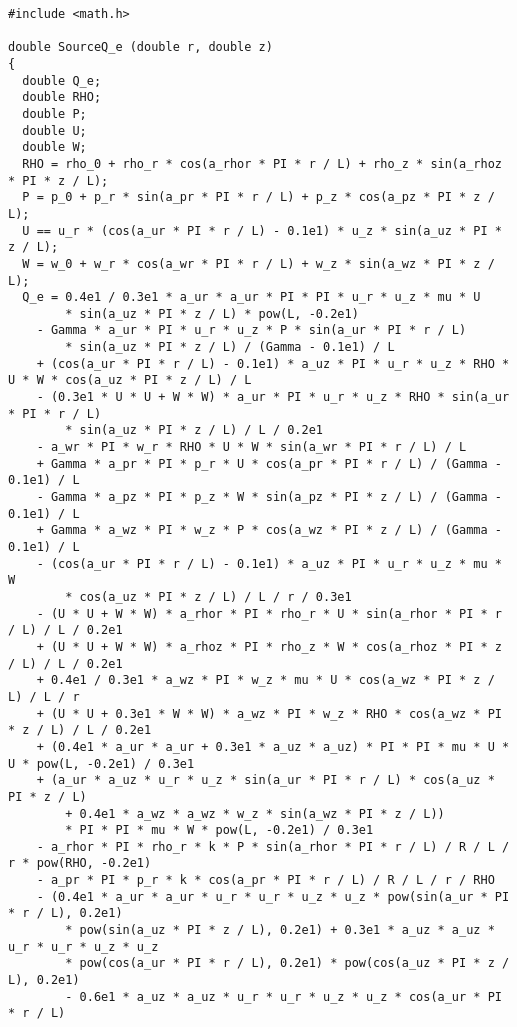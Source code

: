 \documentclass[10pt]{article}
\begin{document}
\begin{small}
\begin{verbatim}
#include <math.h>

double SourceQ_e (double r, double z)
{
  double Q_e;
  double RHO;
  double P;
  double U;
  double W;
  RHO = rho_0 + rho_r * cos(a_rhor * PI * r / L) + rho_z * sin(a_rhoz * PI * z / L);
  P = p_0 + p_r * sin(a_pr * PI * r / L) + p_z * cos(a_pz * PI * z / L);
  U == u_r * (cos(a_ur * PI * r / L) - 0.1e1) * u_z * sin(a_uz * PI * z / L);
  W = w_0 + w_r * cos(a_wr * PI * r / L) + w_z * sin(a_wz * PI * z / L);
  Q_e = 0.4e1 / 0.3e1 * a_ur * a_ur * PI * PI * u_r * u_z * mu * U
        * sin(a_uz * PI * z / L) * pow(L, -0.2e1)
    - Gamma * a_ur * PI * u_r * u_z * P * sin(a_ur * PI * r / L)
        * sin(a_uz * PI * z / L) / (Gamma - 0.1e1) / L
    + (cos(a_ur * PI * r / L) - 0.1e1) * a_uz * PI * u_r * u_z * RHO * U * W * cos(a_uz * PI * z / L) / L
    - (0.3e1 * U * U + W * W) * a_ur * PI * u_r * u_z * RHO * sin(a_ur * PI * r / L)
        * sin(a_uz * PI * z / L) / L / 0.2e1
    - a_wr * PI * w_r * RHO * U * W * sin(a_wr * PI * r / L) / L
    + Gamma * a_pr * PI * p_r * U * cos(a_pr * PI * r / L) / (Gamma - 0.1e1) / L
    - Gamma * a_pz * PI * p_z * W * sin(a_pz * PI * z / L) / (Gamma - 0.1e1) / L
    + Gamma * a_wz * PI * w_z * P * cos(a_wz * PI * z / L) / (Gamma - 0.1e1) / L
    - (cos(a_ur * PI * r / L) - 0.1e1) * a_uz * PI * u_r * u_z * mu * W
        * cos(a_uz * PI * z / L) / L / r / 0.3e1
    - (U * U + W * W) * a_rhor * PI * rho_r * U * sin(a_rhor * PI * r / L) / L / 0.2e1
    + (U * U + W * W) * a_rhoz * PI * rho_z * W * cos(a_rhoz * PI * z / L) / L / 0.2e1
    + 0.4e1 / 0.3e1 * a_wz * PI * w_z * mu * U * cos(a_wz * PI * z / L) / L / r
    + (U * U + 0.3e1 * W * W) * a_wz * PI * w_z * RHO * cos(a_wz * PI * z / L) / L / 0.2e1
    + (0.4e1 * a_ur * a_ur + 0.3e1 * a_uz * a_uz) * PI * PI * mu * U * U * pow(L, -0.2e1) / 0.3e1
    + (a_ur * a_uz * u_r * u_z * sin(a_ur * PI * r / L) * cos(a_uz * PI * z / L)
        + 0.4e1 * a_wz * a_wz * w_z * sin(a_wz * PI * z / L))
        * PI * PI * mu * W * pow(L, -0.2e1) / 0.3e1
    - a_rhor * PI * rho_r * k * P * sin(a_rhor * PI * r / L) / R / L / r * pow(RHO, -0.2e1)
    - a_pr * PI * p_r * k * cos(a_pr * PI * r / L) / R / L / r / RHO
    - (0.4e1 * a_ur * a_ur * u_r * u_r * u_z * u_z * pow(sin(a_ur * PI * r / L), 0.2e1)
        * pow(sin(a_uz * PI * z / L), 0.2e1) + 0.3e1 * a_uz * a_uz * u_r * u_r * u_z * u_z
        * pow(cos(a_ur * PI * r / L), 0.2e1) * pow(cos(a_uz * PI * z / L), 0.2e1)
        - 0.6e1 * a_uz * a_uz * u_r * u_r * u_z * u_z * cos(a_ur * PI * r / L)

\end{verbatim}
\end{small}
\end{document}
